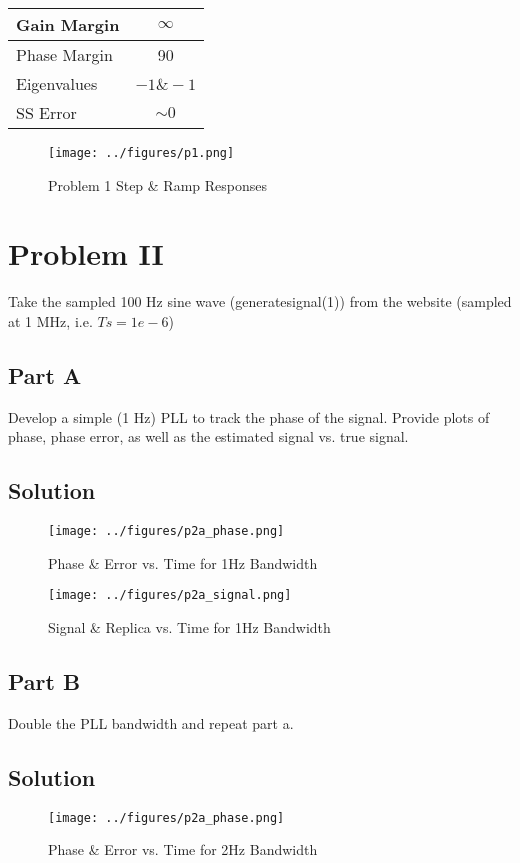 \documentclass{article}
\begin{document}
\begin{center}
    \begin{tabular}{ | l | c | }
      \hline
      Gain Margin & $\infty$ \\ \hline
      Phase Margin & 90 \\ \hline
      Eigenvalues & $-1 \& -1$ \\ \hline
      SS Error & $\sim 0$ \\ \hline
    \end{tabular}
\end{center}

\begin{figure}[H]
    \centering
    \texttt{[image: ../figures/p1.png]}\label{fig:p1}
    \caption{Problem 1 Step \& Ramp Responses}
\end{figure}

\section*{Problem II}
Take the sampled 100 Hz sine wave (generate\textunderscore signal(1)) from the website (sampled at 1
MHz, i.e. $Ts=1e-6$)
\subsection*{Part A}
Develop a simple (1 Hz) PLL to track the phase of the signal. Provide plots of phase,
phase error, as well as the estimated signal vs. true signal.
\subsection*{Solution}
\begin{figure}[H]
    \centering
    \texttt{[image: ../figures/p2a\_phase.png]}\label{fig:p2a_phase}
    \caption{Phase \& Error vs. Time for 1Hz Bandwidth}
\end{figure}

\begin{figure}[H]
    \centering
    \texttt{[image: ../figures/p2a\_signal.png]}\label{fig:p2a_signal}
    \caption{Signal \& Replica vs. Time for 1Hz Bandwidth}
\end{figure}

\subsection*{Part B}
Double the PLL bandwidth and repeat part a.
\subsection*{Solution}
\begin{figure}[H]
    \centering
    \texttt{[image: ../figures/p2a\_phase.png]}\label{fig:p2b_phase}
    \caption{Phase \& Error vs. Time for 2Hz Bandwidth}
\end{figure}
\end{document}
